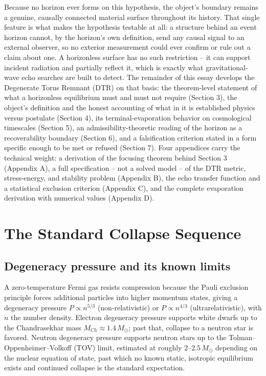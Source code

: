 \documentclass[11pt]{article}
\begin{document}
Because no horizon ever forms on this hypothesis, the object's boundary remains a genuine, causally connected material surface throughout its history. That single feature is what makes the hypothesis testable at all: a structure behind an event horizon cannot, by the horizon's own definition, send any causal signal to an external observer, so no exterior measurement could ever confirm or rule out a claim about one. A horizonless surface has no such restriction -- it can support incident radiation and partially reflect it, which is exactly what gravitational-wave echo searches are built to detect. The remainder of this essay develops the Degenerate Torus Remnant (DTR) on that basis: the theorem-level statement of what a horizonless equilibrium must and must not require (Section 3), the object's definition and the honest accounting of what in it is established physics versus postulate (Section 4), its terminal-evaporation behavior on cosmological timescales (Section 5), an admissibility-theoretic reading of the horizon as a recoverability boundary (Section 6), and a falsification criterion stated in a form specific enough to be met or refused (Section 7). Four appendices carry the technical weight: a derivation of the focusing theorem behind Section 3 (Appendix A), a full specification -- not a solved model -- of the DTR metric, stress-energy, and stability problem (Appendix B), the echo transfer function and a statistical exclusion criterion (Appendix C), and the complete evaporation derivation with numerical values (Appendix D).

\section{The Standard Collapse Sequence}

\subsection{Degeneracy pressure and its known limits}

A zero-temperature Fermi gas resists compression because the Pauli exclusion principle forces additional particles into higher momentum states, giving a degeneracy pressure $P \propto n^{5/3}$ (non-relativistic) or $P \propto n^{4/3}$ (ultrarelativistic), with $n$ the number density. Electron degeneracy pressure supports white dwarfs up to the Chandrasekhar mass $M_{Ch}\approx 1.4\,M_\odot$; past that, collapse to a neutron star is favored. Neutron degeneracy pressure supports neutron stars up to the Tolman--Oppenheimer--Volkoff (TOV) limit, estimated at roughly $2$--$2.5\,M_\odot$ depending on the nuclear equation of state, past which no known static, isotropic equilibrium exists and continued collapse is the standard expectation.
\end{document}
